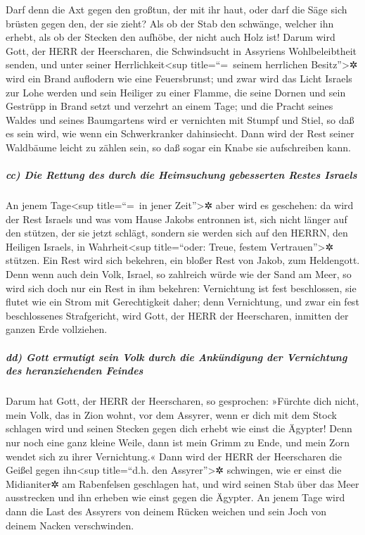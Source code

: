 Darf denn die Axt gegen den großtun, der mit ihr haut,
oder darf die Säge sich brüsten gegen den, der sie zieht? Als ob der
Stab den schwänge, welcher ihn erhebt, als ob der Stecken den aufhöbe,
der nicht auch Holz ist! Darum wird Gott, der HERR der
Heerscharen, die Schwindsucht in Assyriens Wohlbeleibtheit senden, und
unter seiner Herrlichkeit\textless sup title=``=~seinem herrlichen
Besitz''\textgreater✲ wird ein Brand auflodern wie eine Feuersbrunst;
und zwar wird das Licht Israels zur Lohe werden und sein
Heiliger zu einer Flamme, die seine Dornen und sein Gestrüpp in Brand
setzt und verzehrt an einem Tage; und die Pracht seines
Waldes und seines Baumgartens wird er vernichten mit Stumpf und Stiel,
so daß es sein wird, wie wenn ein Schwerkranker dahinsiecht.
Dann wird der Rest seiner Waldbäume leicht zu zählen
sein, so daß sogar ein Knabe sie aufschreiben kann.

\hypertarget{cc-die-rettung-des-durch-die-heimsuchung-gebesserten-restes-israels}{%
\subparagraph{cc) Die Rettung des durch die Heimsuchung gebesserten
Restes
Israels}\label{cc-die-rettung-des-durch-die-heimsuchung-gebesserten-restes-israels}}

An jenem Tage\textless sup title=``=~in jener
Zeit''\textgreater✲ aber wird es geschehen: da wird der Rest Israels und
was vom Hause Jakobs entronnen ist, sich nicht länger auf den stützen,
der sie jetzt schlägt, sondern sie werden sich auf den HERRN, den
Heiligen Israels, in Wahrheit\textless sup title=``oder: Treue, festem
Vertrauen''\textgreater✲ stützen. Ein Rest wird sich
bekehren, ein bloßer Rest von Jakob, zum Heldengott. Denn
wenn auch dein Volk, Israel, so zahlreich würde wie der Sand am Meer, so
wird sich doch nur ein Rest in ihm bekehren: Vernichtung ist fest
beschlossen, sie flutet wie ein Strom mit Gerechtigkeit daher;
denn Vernichtung, und zwar ein fest beschlossenes
Strafgericht, wird Gott, der HERR der Heerscharen, inmitten der ganzen
Erde vollziehen.

\hypertarget{dd-gott-ermutigt-sein-volk-durch-die-ankuxfcndigung-der-vernichtung-des-heranziehenden-feindes}{%
\subparagraph{dd) Gott ermutigt sein Volk durch die Ankündigung der
Vernichtung des heranziehenden
Feindes}\label{dd-gott-ermutigt-sein-volk-durch-die-ankuxfcndigung-der-vernichtung-des-heranziehenden-feindes}}

Darum hat Gott, der HERR der Heerscharen, so gesprochen:
»Fürchte dich nicht, mein Volk, das in Zion wohnt, vor dem Assyrer, wenn
er dich mit dem Stock schlagen wird und seinen Stecken gegen dich erhebt
wie einst die Ägypter! Denn nur noch eine ganz kleine
Weile, dann ist mein Grimm zu Ende, und mein Zorn wendet sich zu ihrer
Vernichtung.« Dann wird der HERR der Heerscharen die
Geißel gegen ihn\textless sup title=``d.h. den Assyrer''\textgreater✲
schwingen, wie er einst die Midianiter✲ am Rabenfelsen geschlagen hat,
und wird seinen Stab über das Meer ausstrecken und ihn erheben wie einst
gegen die Ägypter. An jenem Tage wird dann die Last des
Assyrers von deinem Rücken weichen und sein Joch von deinem Nacken
verschwinden.


